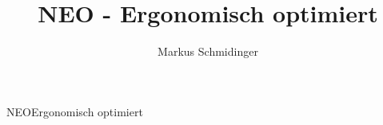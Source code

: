 \documentclass{beamer}
\title{NEO - Ergonomisch optimiert}
\author[M. Schmidinger]{
    Markus Schmidinger
}
\begin{document}
\frame{
  \titlepage
}

\begin{frame}[fragile]{NEO}{Ergonomisch optimiert}

\end{frame}

\end{document}
